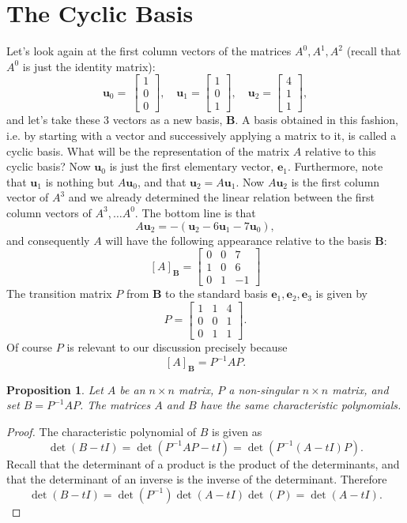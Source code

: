 \documentclass[12pt]{article}
\newcommand{\vu}{\mathbf{u}}
\newcommand{\ve}{\mathbf{e}}
\newcommand{\bB}{{\mathbf{B}}}
\newcommand{\lp}{\left(}
\newcommand{\rp}{\right)}
\newcommand{\lb}{\left[}
\newcommand{\rb}{\right]}
\newcommand{\bvector}[1]{\lb\begin{array}{r} #1 \end{array}\rb}
\newtheorem{proposition}{Proposition}
\begin{document}
 \section{The Cyclic Basis}
 Let's look again at the first column vectors of the matrices $A^0,
 A^1, A^2$ (recall that $A^0$ is just the identity matrix):
 $$\vu_0 = \
 \bvector{1\\0\\0 },\quad
 \vu_1=\bvector{1\\0\\1 },\quad
 \vu_2=\bvector{4\\1\\1},
 $$
 and let's take these $3$ vectors as a new basis, $\bB$.  A basis
 obtained in this fashion, i.e. by starting with a vector and
 successively applying a matrix to it, is called a cyclic basis. What
 will be the representation of the matrix $A$ relative to this cyclic
 basis?  Now $\vu_0$ is just the first elementary vector, $\ve_1$.
 Furthermore, note that $\vu_1$ is nothing but $A\vu_0$, and that
 $\vu_2=A\vu_1$.  Now $A\vu_2$ is the first column vector of $A^3$ and
 we already determined the linear relation between the first column
 vectors of $A^3, \ldots A^0$.  The bottom line is that
 $$A\vu_2 = - (\vu_2-6\vu_1-7\vu_0),$$
 and consequently $A$ will have
 the following appearance relative to the basis $\bB$:
 $$[A]_{\bB} =
 \lb\begin{array}{rrr}
 0 & 0 & 7 \\
 1 & 0 & 6 \\
 0 & 1 & -1
 \end{array}\rb
 $$
 The transition matrix $P$ from $\bB$ to the standard basis $\ve_1,
 \ve_2, \ve_3$ is given by
 $$P= 
 \lb\begin{array}{rrr}
 1&1&4\\
 0&0&1\\
 0&1&1
 \end{array}\rb
 .$$
 Of course $P$ is relevant to our discussion precisely because
 $$[A]_\bB = P^{-1} A P.$$
 \begin{proposition}
 \label{prop:conj}
 Let $A$ be an $n\times n$ matrix, $P$ a non-singular $n\times n$
 matrix, and set $B=P^{-1} A P$.  The matrices $A$ and $B$ have
 the same characteristic polynomials.
 \end{proposition}
 \begin{proof}
 The characteristic polynomial of $B$ is given as
 $$\det(B-tI) = \det\lp P^{-1} A P - tI \rp 
 = \det\lp P^{-1} (A-tI) P \rp.$$
 Recall that the determinant of a product is the product of the
 determinants, and that the determinant of an inverse is the inverse of
 the determinant.  Therefore
 $$\det(B-tI) = \det( P^{-1}) \det(A-tI) \det(P) = \det(A-tI).$$
 \end{proof}
\end{document}
